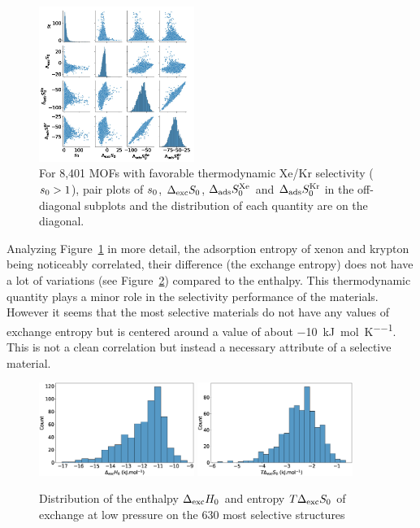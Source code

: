 \documentclass[main.tex]{subfiles}
\begin{document}
\begin{figure}[ht]
  \centering
    \includegraphics[width=0.45\textwidth]{figures/2-thermo/Entropy_0.jpg}
    \caption{For 8,401 MOFs with favorable thermodynamic Xe/Kr selectivity ($s_{\text{0}} > 1$), pair plots of $s_{\text{0}}$, $\Delta_{\text{exc}}S_{\text{0}}$, $\Delta_{\text{ads}}S^{\text{Xe}}_{\text{0}}$ and $\Delta_{\text{ads}}S^{\text{Kr}}_{\text{0}}$ in the off-diagonal subplots and the distribution of each quantity are on the diagonal.}\label{fgr:SI:HS_0_log}
\end{figure}

Analyzing Figure~\ref{fgr:SI:HS_0_log} in more detail, the adsorption entropy of xenon and krypton being noticeably correlated, their difference (the exchange entropy) does not have a lot of variations (see Figure~\ref{fgr:SI:dist0}) compared to the enthalpy. This thermodynamic quantity plays a minor role in the selectivity performance of the materials. However it seems that the most selective materials do not have any values of exchange entropy but is centered around a value of about \SI{-10}{\kilo\joule\per\mole\per\kelvin}. This is not a clean correlation but instead a necessary attribute of a selective material.

\begin{figure}[ht]
  \centering
    \includegraphics[width=0.45\textwidth]{figures/2-thermo/Delta_H_0.jpg}
    \includegraphics[width=0.45\textwidth]{figures/2-thermo/T_Delta_S_0.jpg}
    \caption{Distribution of the enthalpy $\Delta_{\text{exc}}H_{\text{0}}$ and entropy $T\Delta_{\text{exc}}S_{\text{0}}$ of exchange at low pressure on the 630 most selective structures}\label{fgr:SI:dist0}
\end{figure}
\end{document}

